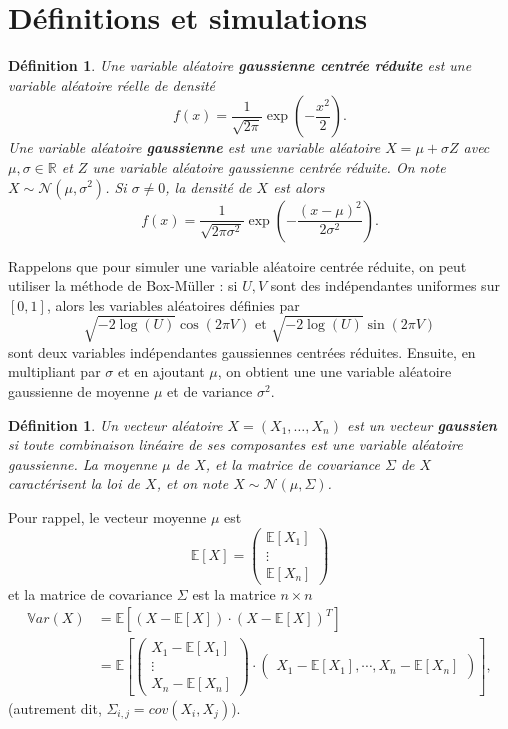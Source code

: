 \documentclass[a4paper,12pt]{book}
\newtheorem{defnfr}[thmfr]{Définition}
\begin{document}
\section{Définitions et simulations}
\begin{defnfr}Une variable aléatoire \textbf{gaussienne centrée réduite} est une variable aléatoire réelle de densité
$$f(x)=\frac{1}{\sqrt{2\pi}}\exp\left(-\frac{x^2}{2}\right).$$
Une variable aléatoire \textbf{gaussienne} est une variable aléatoire $X=\mu+\sigma Z$ avec $\mu,\sigma\in \mathbb{R}$ et $Z$ une variable aléatoire gaussienne centrée réduite. On note $X\sim \mathcal{N}(\mu,\sigma^2)$. Si $\sigma\neq 0$, la densité de $X$ est alors
$$f(x)=\frac{1}{\sqrt{2\pi\sigma^2}}\exp\left(-\frac{(x-\mu)^2}{2\sigma^2}\right).$$
\end{defnfr}
Rappelons que pour simuler une variable aléatoire centrée réduite, on peut utiliser la méthode de Box-Müller :
si $U,V$ sont des ind\'ependantes uniformes sur $[0,1]$, alors les variables aléatoires définies par
$$ \sqrt{- 2 \log (U)} \cos(2 \pi V)\text{ et }\sqrt{- 2 \log (U)} \sin(2 \pi V)$$
sont deux variables ind\'ependantes gaussiennes centr\'ees r\'eduites. Ensuite, en multipliant par $\sigma$ et en ajoutant $\mu$, on obtient une une variable aléatoire gaussienne de moyenne $\mu$ et de variance $\sigma^2$.
\begin{defnfr}Un vecteur aléatoire $X=(X_1,\ldots,X_n)$ est un vecteur \textbf{gaussien} si toute combinaison linéaire de ses composantes est une variable aléatoire gaussienne. La moyenne $\mu$ de $X$, et la matrice de covariance $\Sigma$ de $X$ caractérisent la loi de $X$, et on note $X\sim \mathcal{N}(\mu,\Sigma)$.
\end{defnfr}
Pour rappel, le vecteur moyenne $\mu$ est
$$\mathbb{E}[X]=\left(\begin{array}{c}
\mathbb{E}[X_1] \\
\vdots\\
\mathbb{E}[X_n]
\end{array} \right) $$
et la matrice de covariance $\Sigma$ est la matrice $n\times n$
\begin{align*}
\mathbb{V}ar(X)&=\mathbb{E}\left[(X-\mathbb{E}[X])\cdot (X-\mathbb{E}[X])^T\right]\\
&=\mathbb{E}\left[\left(\begin{array}{c}
X_1-\mathbb{E}[X_1] \\
\vdots\\
X_n-\mathbb{E}[X_n]
\end{array} \right)\cdot \left(\begin{array}{ccc}
X_1-\mathbb{E}[X_1], \cdots, X_n-\mathbb{E}[X_n]
\end{array} \right) \right],
\end{align*}
(autrement dit, $\Sigma_{i,j}=cov(X_i,X_j)$).
\end{document}
